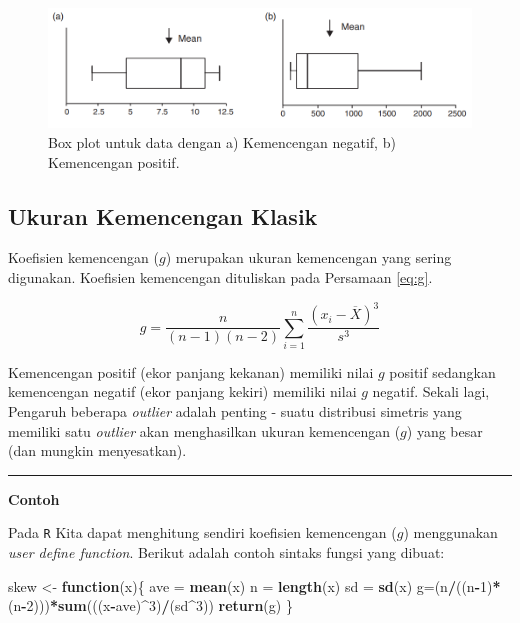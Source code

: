 \documentclass[]{book}
\newenvironment{Shaded}{\begin{snugshade}}{\end{snugshade}}
\newcommand{\KeywordTok}[1]{\textcolor[rgb]{0.13,0.29,0.53}{\textbf{#1}}}
\newcommand{\DecValTok}[1]{\textcolor[rgb]{0.00,0.00,0.81}{#1}}
\newcommand{\StringTok}[1]{\textcolor[rgb]{0.31,0.60,0.02}{#1}}
\newcommand{\ControlFlowTok}[1]{\textcolor[rgb]{0.13,0.29,0.53}{\textbf{#1}}}
\newcommand{\OperatorTok}[1]{\textcolor[rgb]{0.81,0.36,0.00}{\textbf{#1}}}
\newcommand{\NormalTok}[1]{#1}
\begin{document}
\begin{figure}

{\centering \includegraphics[width=0.7\linewidth]{skewnessbox} 

}

\caption{Box plot untuk data dengan a) Kemencengan negatif, b) Kemencengan positif.}\label{fig:skew2}
\end{figure}

\subsection{Ukuran Kemencengan Klasik}\label{ukuran-kemencengan-klasik}

Koefisien kemencengan (\(g\)) merupakan ukuran kemencengan yang sering
digunakan. Koefisien kemencengan dituliskan pada Persamaan \eqref{eq:g}.

\begin{equation}
  g=\frac{n}{\left(n-1\right)\left(n-2\right)}\sum_{i=1}^n\frac{\left(x_i-\overline{X}\right)^3}{s^3}
  \label{eq:g}
\end{equation}

Kemencengan positif (ekor panjang kekanan) memiliki nilai \(g\) positif
sedangkan kemencengan negatif (ekor panjang kekiri) memiliki nilai \(g\)
negatif. Sekali lagi, Pengaruh beberapa \emph{outlier} adalah penting -
suatu distribusi simetris yang memiliki satu \emph{outlier} akan
menghasilkan ukuran kemencengan (\(g\)) yang besar (dan mungkin
menyesatkan).

\begin{center}\rule{0.5\linewidth}{\linethickness}\end{center}

\textbf{Contoh}

Pada \texttt{R} Kita dapat menghitung sendiri koefisien kemencengan
(\(g\)) menggunakan \emph{user define function}. Berikut adalah contoh
sintaks fungsi yang dibuat:

\begin{Shaded}
\begin{Highlighting}[]
\NormalTok{skew <-}\StringTok{ }\ControlFlowTok{function}\NormalTok{(x)\{}
\NormalTok{  ave =}\StringTok{ }\KeywordTok{mean}\NormalTok{(x)}
\NormalTok{  n =}\StringTok{ }\KeywordTok{length}\NormalTok{(x)}
\NormalTok{  sd =}\StringTok{ }\KeywordTok{sd}\NormalTok{(x)}
\NormalTok{  g=(n}\OperatorTok{/}\NormalTok{((n}\OperatorTok{-}\DecValTok{1}\NormalTok{)}\OperatorTok{*}\NormalTok{(n}\OperatorTok{-}\DecValTok{2}\NormalTok{)))}\OperatorTok{*}\KeywordTok{sum}\NormalTok{(((x}\OperatorTok{-}\NormalTok{ave)}\OperatorTok{^}\DecValTok{3}\NormalTok{)}\OperatorTok{/}\NormalTok{(sd}\OperatorTok{^}\DecValTok{3}\NormalTok{))}
  \KeywordTok{return}\NormalTok{(g)}
\NormalTok{\}}
\end{Highlighting}
\end{Shaded}
\end{document}
